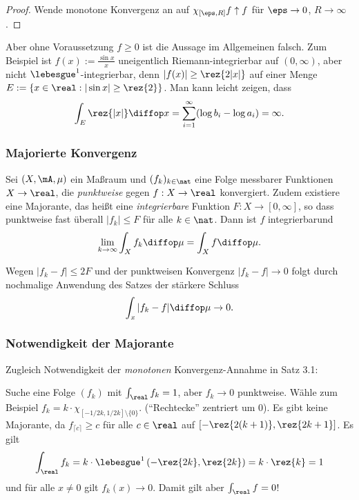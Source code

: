 \begin{proof}
 Wende monotone Konvergenz an auf $\chi_{[\eps,R]} f \uparrow f$ für $\eps \to 0$, $R \to \infty$.
\end{proof}

Aber ohne Voraussetzung $f \ge 0$ ist die Aussage im Allgemeinen falsch. Zum Beispiel ist $f(x) := \frac{\sin x}{x}$ uneigentlich Riemann-integrierbar auf $(0,\infty)$, aber nicht $\lebesgue^1$-integrierbar, denn $|f(x)| \ge \rez{2 |x|}$ auf einer Menge $E := \{ x \in \real: |\sin x| \ge \rez{2} \}$. Man kann leicht zeigen, dass
\[ \int_E \rez{|x|} \diffop x = \sum_{i=1}^\infty ( \log b_i - \log a_i ) = \infty. \]

\subsubsection{Majorierte Konvergenz}
\begin{thm}
 Sei $(X, \mA, \mu)$ ein Maßraum und $(f_k)_{k \in \nat}$ eine Folge messbarer Funktionen $X \to \real$, die \emph{punktweise} gegen $f:X \to \real$ konvergiert. Zudem existiere eine Majorante, das heißt eine \emph{integrierbare} Funktion $F: X \to [0, \infty]$, so dass punktweise fast überall $|f_k| \le F$ für alle $k \in \nat$. Dann ist $f$ integrierbar\footnotemark und
 \[ \lim_{k \to \infty} \int_X f_k \diffop \mu = \int_X f \diffop \mu. \]
\end{thm}

\begin{rmrk}
 Wegen $|f_k -f| \le 2F$ und der punktweisen Konvergenz $|f_k - f| \to 0$ folgt durch nochmalige Anwendung des Satzes der stärkere Schluss
 \[ \int_x |f_k - f| \diffop \mu \to 0. \]
\end{rmrk}

\subsubsection*{Notwendigkeit der Majorante}
Zugleich Notwendigkeit der \emph{monotonen} Konvergenz-Annahme in Satz 3.1:

Suche eine Folge $(f_k)$ mit $\int_\real f_k = 1$, aber $f_k \to 0$ punktweise. Wähle zum Beispiel $f_k = k \cdot \chi_{[-1/2k,1/2k]\setminus \{ 0 \}}$. (``Rechtecke'' zentriert um 0). Es gibt keine Majorante, da $f_{\lceil c \rceil} \geq c$ für alle $c\in\real$ auf $\left[ -\rez{2(k+1)}, \rez{2k+1} \right]$. Es gilt
\[ \int_\real f_k = k \cdot \lebesgue^1 \left( -\rez{2k}, \rez{2k} \right) = k \cdot \rez{k} = 1 \]
und für alle $x \ne 0$ gilt $f_k(x) \to 0$. Damit gilt aber $\int_\real f = 0$!

